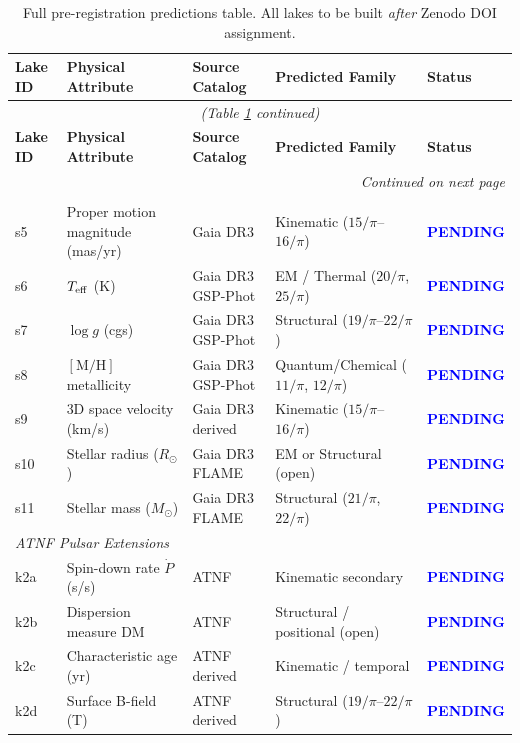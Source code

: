 \documentclass[12pt,a4paper]{article}
\newcommand{\pending}{\textcolor{blue}{\textbf{PENDING}}}
\begin{document}
\begin{longtable}{p{1.5cm} p{5.0cm} p{3.0cm} p{3.5cm} p{1.5cm}}
\caption{Full pre-registration predictions table. All lakes to be built
\emph{after} Zenodo DOI assignment.}
\label{tab:full_predictions}\\
\toprule
\textbf{Lake ID} & \textbf{Physical Attribute} & \textbf{Source Catalog} &
\textbf{Predicted Family} & \textbf{Status} \\
\midrule
\endfirsthead
\multicolumn{5}{c}{\textit{(Table \ref{tab:full_predictions} continued)}}\\
\toprule
\textbf{Lake ID} & \textbf{Physical Attribute} & \textbf{Source Catalog} &
\textbf{Predicted Family} & \textbf{Status} \\
\midrule
\endhead
\midrule \multicolumn{5}{r}{\textit{Continued on next page}}\\
\endfoot
\bottomrule
\endlastfoot

\multicolumn{5}{l}{\textit{Gaia Stellar Pool Extensions}}\\[0.2em]
s5 & Proper motion magnitude (mas/yr) & Gaia DR3 & Kinematic ($15/\pi$--$16/\pi$) & \pending \\
s6 & $T_{\rm eff}$ (K) & Gaia DR3 GSP-Phot & EM / Thermal ($20/\pi$, $25/\pi$) & \pending \\
s7 & $\log g$ (cgs) & Gaia DR3 GSP-Phot & Structural ($19/\pi$--$22/\pi$) & \pending \\
s8 & $[\mathrm{M/H}]$ metallicity & Gaia DR3 GSP-Phot & Quantum/Chemical ($11/\pi$, $12/\pi$) & \pending \\
s9 & 3D space velocity (km/s) & Gaia DR3 derived & Kinematic ($15/\pi$--$16/\pi$) & \pending \\
s10 & Stellar radius ($R_\odot$) & Gaia DR3 FLAME & EM or Structural (open) & \pending \\
s11 & Stellar mass ($M_\odot$) & Gaia DR3 FLAME & Structural ($21/\pi$, $22/\pi$) & \pending \\[0.3em]

\multicolumn{5}{l}{\textit{ATNF Pulsar Extensions}}\\[0.2em]
k2a & Spin-down rate $\dot{P}$ (s/s) & ATNF & Kinematic secondary & \pending \\
k2b & Dispersion measure DM & ATNF & Structural / positional (open) & \pending \\
k2c & Characteristic age (yr) & ATNF derived & Kinematic / temporal & \pending \\
k2d & Surface B-field (T) & ATNF derived & Structural ($19/\pi$--$22/\pi$) & \pending \\[0.3em]


\end{longtable}
\end{document}
